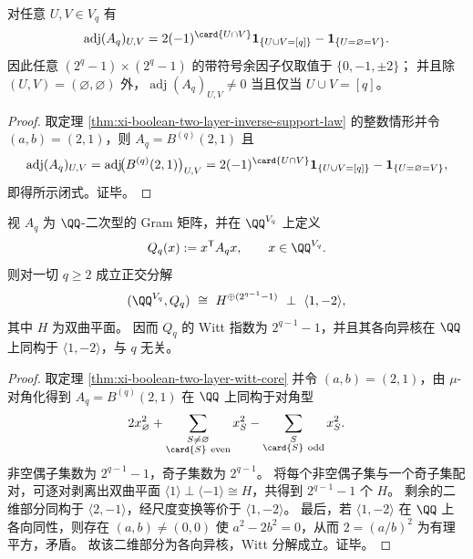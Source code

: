 \begin{corollary}[伴随矩阵的覆盖支撑与带符号余因子值域]\label{cor:xi-disjointness-boolean-adjugate-cover-support}
对任意 \(U,V\in V_q\) 有
\[
\operatorname{adj}(A_q)_{U,V}
=
2(-1)^{\card{U\cap V}}\mathbf 1_{\{U\cup V=[q]\}}
-\mathbf 1_{\{U=\varnothing=V\}}.
\]
因此任意 \((2^q-1)\times(2^q-1)\) 的带符号余因子仅取值于 \(\{0,-1,\pm2\}\)；
并且除 \((U,V)=(\varnothing,\varnothing)\) 外，\(\operatorname{adj}(A_q)_{U,V}\neq 0\) 当且仅当 \(U\cup V=[q]\)。
\end{corollary}

\begin{proof}
取定理 \ref{thm:xi-boolean-two-layer-inverse-support-law} 的整数情形并令 \((a,b)=(2,1)\)，则 \(A_q=B^{(q)}(2,1)\) 且
\[
\operatorname{adj}(A_q)_{U,V}
=\operatorname{adj}\!\bigl(B^{(q)}(2,1)\bigr)_{U,V}
=2(-1)^{\card{U\cap V}}\mathbf 1_{\{U\cup V=[q]\}}
-\mathbf 1_{\{U=\varnothing=V\}},
\]
即得所示闭式。证毕。
\end{proof}

\begin{proposition}\label{prop:xi-disjointness-boolean-witt-decomposition-q}
视 \(A_q\) 为 \(\QQ\)-二次型的 Gram 矩阵，并在 \(\QQ^{V_q}\) 上定义
\[
Q_q(x):=x^{\mathsf T}A_qx,\qquad x\in\QQ^{V_q}.
\]
则对一切 \(q\ge 2\) 成立正交分解
\[
(\QQ^{V_q},Q_q)\ \cong\ H^{\oplus (2^{q-1}-1)}\ \perp\ \langle 1,-2\rangle,
\]
其中 \(H\) 为双曲平面。
因而 \(Q_q\) 的 Witt 指数为 \(2^{q-1}-1\)，并且其各向异核在 \(\QQ\) 上同构于 \(\langle 1,-2\rangle\)，与 \(q\) 无关。
\end{proposition}

\begin{proof}
取定理 \ref{thm:xi-boolean-two-layer-witt-core} 并令 \((a,b)=(2,1)\)，由 \(\mu\)-对角化得到 \(A_q=B^{(q)}(2,1)\) 在 \(\QQ\) 上同构于对角型
\[
2x_{\varnothing}^2+\sum_{\substack{S\neq\varnothing\\ \card{S}\ \mathrm{even}}}x_S^2
-\sum_{\substack{S\\ \card{S}\ \mathrm{odd}}}x_S^2.
\]
非空偶子集数为 \(2^{q-1}-1\)，奇子集数为 \(2^{q-1}\)。
将每个非空偶子集与一个奇子集配对，可逐对剥离出双曲平面 \(\langle 1\rangle\perp\langle-1\rangle\cong H\)，共得到 \(2^{q-1}-1\) 个 \(H\)。
剩余的二维部分同构于 \(\langle 2,-1\rangle\)，经尺度变换等价于 \(\langle 1,-2\rangle\)。
最后，若 \(\langle 1,-2\rangle\) 在 \(\QQ\) 上各向同性，则存在 \((a,b)\neq (0,0)\) 使 \(a^2-2b^2=0\)，从而 \(2=(a/b)^2\) 为有理平方，矛盾。
故该二维部分为各向异核，Witt 分解成立。证毕。
\end{proof}

